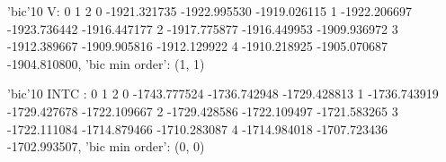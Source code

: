 
'bic'10 V:              0            1            2
0 -1921.321735 -1922.995530 -1919.026115
1 -1922.206697 -1923.736442 -1916.447177
2 -1917.775877 -1916.449953 -1909.936972
3 -1912.389667 -1909.905816 -1912.129922
4 -1910.218925 -1905.070687 -1904.810800, 'bic min order': (1, 1)

'bic'10 INTC :              0            1            2
0 -1743.777524 -1736.742948 -1729.428813
1 -1736.743919 -1729.427678 -1722.109667
2 -1729.428586 -1722.109497 -1721.583265
3 -1722.111084 -1714.879466 -1710.283087
4 -1714.984018 -1707.723436 -1702.993507, 'bic min order': (0, 0)
